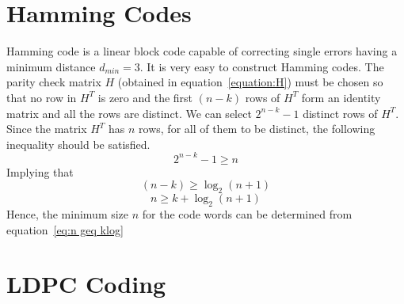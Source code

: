 \section{Hamming Codes}
Hamming code is a linear block code capable of correcting single errors having a minimum distance $d_{min} = 3$. It is very easy to construct Hamming codes. The parity check matrix $H$ (obtained in equation~\ref{equation:H}) must be chosen so that no row in $H^T$ is zero and the first $(n-k)$ rows of $H^T$ form an identity matrix and all the rows are distinct. We can select $2^{n-k}-1$ distinct rows of $H^T$.\\
Since the matrix $H^T$ has $n$ rows, for all of them to be distinct, the following inequality should be satisfied.
\[ 2^{n-k} -1 \geq n \]
Implying that
\[ (n-k) \geq \log_2(n+1) \]
\begin{equation}
    \label{eq:n geq klog}
    n \geq k + \log_2(n+1)
\end{equation}
Hence, the minimum size $n$ for the code words can be determined from equation~\ref{eq:n geq klog}


\section{LDPC Coding}